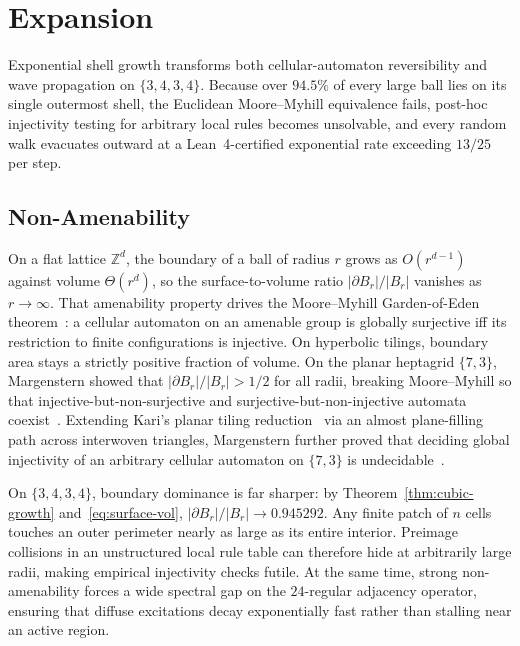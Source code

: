 \section{Expansion}
\label{sec:expansion}

Exponential shell growth transforms both cellular-automaton reversibility and wave propagation on $\{3,4,3,4\}$. Because over $94.5\%$ of every large ball lies on its single outermost shell, the Euclidean Moore--Myhill equivalence fails, post-hoc injectivity testing for arbitrary local rules becomes unsolvable, and every random walk evacuates outward at a Lean~4-certified exponential rate exceeding $13/25$ per step.

\subsection{Non-Amenability}
\label{subsec:non-amenability}

On a flat lattice $\mathbb{Z}^d$, the boundary of a ball of radius $r$ grows as $O(r^{d-1})$ against volume $\Theta(r^d)$, so the surface-to-volume ratio $|\partial B_r|/|B_r|$ vanishes as $r \to \infty$. That amenability property drives the Moore--Myhill Garden-of-Eden theorem~\cite{moore1962,myhill1963,bartholdi2010}: a cellular automaton on an amenable group is globally surjective iff its restriction to finite configurations is injective. On hyperbolic tilings, boundary area stays a strictly positive fraction of volume. On the planar heptagrid $\{7,3\}$, Margenstern showed that $|\partial B_r|/|B_r| > 1/2$ for all radii, breaking Moore--Myhill so that injective-but-non-surjective and surjective-but-non-injective automata coexist~\cite{margenstern2007hedlund,margenstern2008injectivity}. Extending Kari's planar tiling reduction~\cite{kari1990,kari1994} via an almost plane-filling path across interwoven triangles, Margenstern further proved that deciding global injectivity of an arbitrary cellular automaton on $\{7,3\}$ is undecidable~\cite{margenstern2008injectivity}.

On $\{3,4,3,4\}$, boundary dominance is far sharper: by Theorem~\ref{thm:cubic-growth} and~\eqref{eq:surface-vol}, $|\partial B_r|/|B_r| \to 0.945292$. Any finite patch of $n$ cells touches an outer perimeter nearly as large as its entire interior. Preimage collisions in an unstructured local rule table can therefore hide at arbitrarily large radii, making empirical injectivity checks futile. At the same time, strong non-amenability forces a wide spectral gap on the $24$-regular adjacency operator, ensuring that diffuse excitations decay exponentially fast rather than stalling near an active region.

